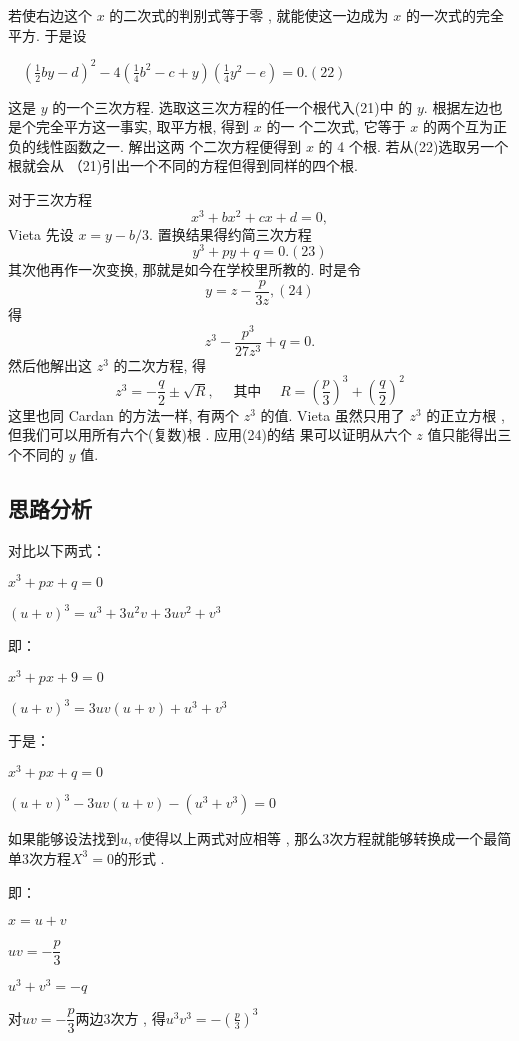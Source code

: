 若使右边这个 $x$ 的二次式的判别式等于零 , 就能使这一边成为 $x$
的一次式的完全平方. 于是设

$\quad\left(\frac{1}{2} b y-d\right)^{2}-4\left(\frac{1}{4} b^{2}-c+y\right)\left(\frac{1}{4} y^{2}-e\right)=0.(22)$

这是 $y$ 的一个三次方程. 选取这三次方程的任一个根代入(21)中
的 $y$. 根据左边也是个完全平方这一事实, 取平方根, 得到 $x$ 的一 
个二次式, 它等于 $x$ 的两个互为正负的线性函数之一. 解出这两
个二次方程便得到 $x$ 的 4 个根. 若从(22)选取另一个根就会从
（21)引出一个不同的方程但得到同样的四个根.

对于三次方程
\[
x^{3}+b x^{2}+c x+d=0,
\]
Vieta 先设 $x=y-b / 3 .$ 置换结果得约简三次方程
\[
y^{3}+p y+q=0 .(23)
\]
其次他再作一次变换, 那就是如今在学校里所教的. 时是令
\[
y=z-\frac{p}{3 z},(24)
\]
得
\[
z^{3}-\frac{p^{3}}{27 z^{3}}+q=0.
\]
然后他解出这 $z^{3}$ 的二次方程, 得
\[
z^{3}=-\frac{q}{2} \pm \sqrt{R},  \quad \text { 其中 } \quad R=\left(\frac{p}{3}\right)^{3}+\left(\frac{q}{2}\right)^{2}
\]
这里也同 Cardan 的方法一样, 有两个 $z^{3}$ 的值. Vieta 虽然只用了
$z^{3}$ 的正立方根 , 但我们可以用所有六个(复数)根 . 应用(24)的结
果可以证明从六个 $z$ 值只能得出三个不同的 $y$ 值.











\subsection{思路分析}
对比以下两式：

$x^{3}+p x+q=0$

$(u+v)^{3}=u^{3}+3 u^{2} v+3 u v^{2}+v^{3}$

即：

$x^{3}+p x+9=0$

$(u+v)^{3}=3 u v(u+v)+u^{3}+v^{3}$

于是：

$x^{3}+p x+q=0$

$(u+v)^{3}-3 u v(u+v)-\left(u^{3}+v^{3}\right)=0$

如果能够设法找到$u,v$使得以上两式对应相等 , 那么3次方程就能够转换成一个最简单3次方程$X^3=0$的形式 . 

即：

$x=u+v$

$uv=-\dfrac{p}{3}$

$u^3+v^3=-q$

对$uv=-\dfrac{p}{3}$两边3次方 , 得$u^{3} v^{3}=-\left(\frac{p}{3}\right)^{3}$

